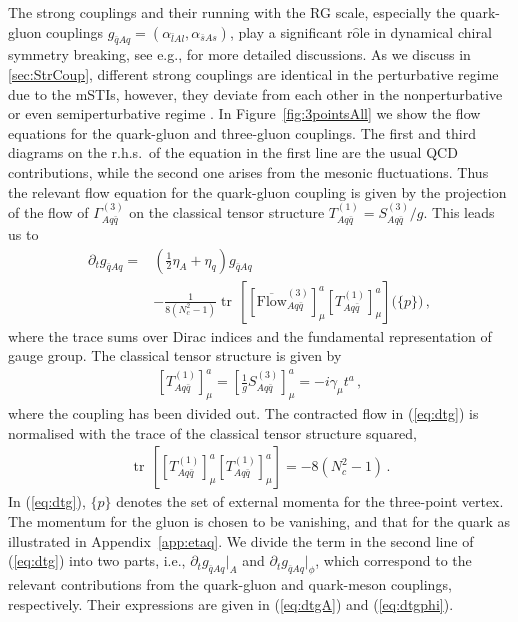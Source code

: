 \documentclass[%
reprint,
superscriptaddress,
showpacs,preprintnumbers,
 amsmath,amssymb,
 aps,
prd,
]{revtex4-1}
\newcommand{\tr}{\ensuremath{\operatorname{tr}}}
\def\Fig#1{Figure~\ref{#1}}
\def\eq#1{(\ref{#1})}
\def\app#1{Appendix~\ref{#1}}
\begin{document}
The strong couplings and their running with the RG scale, especially
the quark-gluon couplings
$g_{\bar{q}Aq}=(\alpha_{\bar l A l},\alpha_{\bar s A s})$, play a
significant r$\hat{\textrm{o}}$le in dynamical chiral symmetry
breaking, see e.g., \cite{Gies:2002hq, Braun:2006jd, Braun:2014ata,
  Mitter:2014wpa} for more detailed discussions. As we discuss in
\ref{sec:StrCoup}, different strong couplings are identical in the
perturbative regime due to the mSTIs, however, they deviate from each
other in the nonperturbative or even semiperturbative regime
\cite{Cyrol:2017ewj}. In \Fig{fig:3pointsAll} we show the flow
equations for the quark-gluon and three-gluon couplings. The first and
third diagrams on the r.h.s.\ of the equation in the first line are
the usual QCD contributions, while the second one arises from the
mesonic fluctuations. Thus the relevant flow equation for the
quark-gluon coupling is given by the projection of the flow of
$\Gamma^{(3)}_{A q\bar q }$ on the classical tensor structure
$T^{{(1)}}_{A q\bar q }=S^{(3)}_{A q\bar q }/g$. This leads us to
%
\begin{align}
  \partial_t g_{\bar{q} A  q}=
  &\left( \frac12\eta_A+\eta_q\right) g_{\bar{q}Aq}
    \nonumber \\[1ex]
  &-\frac{1}{8(N_c^2-1)}\tr\,\left[\left[
    \overline{{\textrm{Flow}}}^{(3)}_{A q\bar{q} }\right]^{a}_{\mu} 
    \left[ T^{{(1)}}_{A q\bar q }\right]^a_{\mu}\right]\big(\{p\})\,,
 \label{eq:dtg}
\end{align}
%
where the trace sums over Dirac indices and the fundamental
representation of gauge group. The classical tensor structure is given
by
%
\begin{align}\label{eq:SqbarqA}
  \left[T^{{(1)}}_{A q\bar q }\right]^a_{\mu}
  = \left[\frac{1}{g}S^{(3)}_{A q\bar q }
  \right]^a_{\mu} = -i \gamma_\mu t^a\,,
\end{align}
%
where the coupling has been divided out. The contracted flow in
\eq{eq:dtg} is normalised with the trace of the classical tensor
structure squared, 
%
\begin{align}
  \tr \,\left[\left[ T^{(1)}_{A q\bar{q} }\right]^{a}_{\mu} 
  \left[ T^{(1)}_{A q\bar q }\right]^a_{\mu}\right]
  = - 8 (N_c^2 -1)\,.
\end{align}
%
In \eq{eq:dtg}, $\{p\}$ denotes the set of external momenta for the
three-point vertex. The momentum for the gluon is chosen to be
vanishing, and that for the quark as illustrated in \app{app:etaq}. We
divide the term in the second line of \eq{eq:dtg} into two parts,
i.e., $\partial_t g_{\bar{q}Aq} \big |_A$ and
$\partial_t g_{\bar{q}Aq}\big |_{\phi}$, which correspond to the
relevant contributions from the quark-gluon and quark-meson couplings,
respectively. Their expressions are given in \eq{eq:dtgA} and
\eq{eq:dtgphi}.
\end{document}
